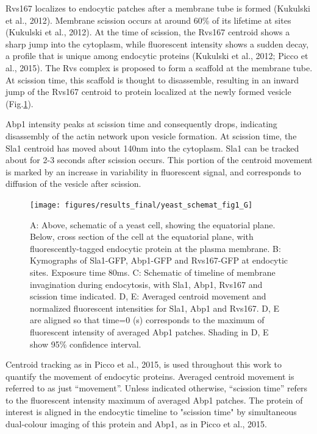 \vspace{5mm}
Rvs167 localizes to endocytic patches after a membrane tube is formed (Kukulski et al., 2012). Membrane scission occurs at around 60\% of its lifetime at sites (Kukulski et al., 2012). At the time of scission, the Rvs167 centroid shows a sharp jump into the cytoplasm, while fluorescent intensity shows a sudden decay, a profile that is unique among endocytic proteins (Kukulski et al., 2012; Picco et al., 2015). The Rvs complex is proposed to form a scaffold at the membrane tube. At scission time, this scaffold is thought to disassemble, resulting in an inward jump of the Rvs167 centroid to protein localized at the newly formed vesicle (Fig.\ref{fig1_schematic}). 

\vspace{5mm}
Abp1 intensity peaks at scission time and consequently drops, indicating disassembly of the actin network upon vesicle formation. At scission time, the Sla1 centroid has moved about 140nm into the cytoplasm. Sla1 can be tracked about for 2-3 seconds after scission occurs. This portion of the centroid movement is marked by an increase in variability in fluorescent signal, and corresponds to diffusion of the vesicle after scission.




	\begin{figure}[H]
	\centering
	\hspace*{-1.9cm}%
	\texttt{[image: figures/results\_final/yeast\_schemat\_fig1\_G]}
	\caption[Tracking yeast endocytic proteins]
	{A: Above, schematic of a yeast cell, showing the equatorial plane. Below, cross section of the cell at the equatorial plane, with fluorescently-tagged endocytic protein at the plasma membrane. 
B: Kymographs of Sla1-GFP, Abp1-GFP and Rvs167-GFP at endocytic sites. Exposure time 80ms.
C: Schematic of timeline of membrane invagination during endocytosis, with Sla1, Abp1, Rvs167 and scission time indicated. 
D, E: Averaged centroid movement and normalized fluorescent intensities for Sla1, Abp1 and Rvs167. D, E are aligned so that time=0 (s) corresponds to the maximum of fluorescent intensity of averaged Abp1 patches. Shading in D, E show 95\% confidence interval.  
	\label{fig1_schematic}}
	\end{figure}

\vspace{5mm}
Centroid tracking as in Picco et al., 2015, is used throughout this work to quantify the movement of endocytic proteins. Averaged centroid movement is referred to as just  “movement”. Unless indicated otherwise, “scission time” refers to the fluorescent intensity maximum of averaged Abp1 patches. The protein of interest is aligned in the endocytic timeline to "scission time" by simultaneous dual-colour imaging of this protein and Abp1, as in Picco et al., 2015.

